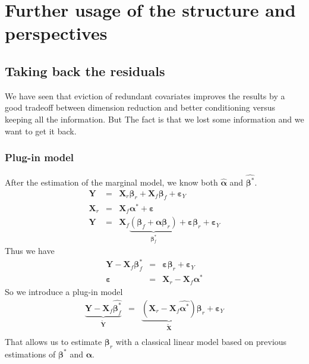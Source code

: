 \documentclass[12pt,a4paper]{report}
\begin{document}
\part{Further usage of the structure and perspectives}	
			
		
\chapter{Taking back the residuals}
	We have seen that eviction of redundant covariates improves the results by a good tradeoff between dimension reduction and better conditioning versus keeping all the information. But The fact is that we lost some information and we want to get it back.
	\section{Plug-in model}
		After the estimation of the marginal model, we know both $\hat{\boldsymbol{\alpha}}$ and $\hat{\boldsymbol{\beta}^*}$.
		\begin{eqnarray}
			\boldsymbol{Y}&=& \boldsymbol{X}_r\boldsymbol{\beta}_r+\boldsymbol{X}_f\boldsymbol{\beta}_f+\boldsymbol{\varepsilon}_Y \\
			\boldsymbol{X}_r&=&\boldsymbol{X}_f\boldsymbol{\alpha}^*+\boldsymbol{\varepsilon} \\
			\boldsymbol{Y}&=& \boldsymbol{X}_f\underbrace{(\boldsymbol{\beta}_f+\boldsymbol{\alpha}\boldsymbol{\beta}_r)}_{\boldsymbol{\beta}^*_f}+\boldsymbol{\varepsilon}\boldsymbol{\beta}_r+\boldsymbol{\varepsilon}_Y 
					\end{eqnarray}		 
		Thus we have
		\begin{eqnarray}
			\boldsymbol{Y}- \boldsymbol{X}_f\boldsymbol{\beta}^*_f&=&\boldsymbol{\varepsilon}\boldsymbol{\beta}_r+\boldsymbol{\varepsilon}_Y \\
			\boldsymbol{\varepsilon}&=&\boldsymbol{X}_r-\boldsymbol{X}_f\boldsymbol{\alpha}^*
		\end{eqnarray}		 
		So we introduce a plug-in model
		\begin{eqnarray}
			\underbrace{\boldsymbol{Y}- \boldsymbol{X}_f\hat{\boldsymbol{\beta}^*_f}}_{\tilde{\boldsymbol{Y}}}&=&\underbrace{(\boldsymbol{X}_r-\boldsymbol{X}_f\hat{\boldsymbol{\alpha}^*})}_{\tilde{\boldsymbol{X}}}\boldsymbol{\beta}_r+\boldsymbol{\varepsilon}_Y \\
		\end{eqnarray}
		That allows us to estimate $\boldsymbol{\beta}_{r}$ with a classical linear model based on previous estimations of $\boldsymbol{\beta}^*$ and $\boldsymbol{\alpha}$.
\end{document}
